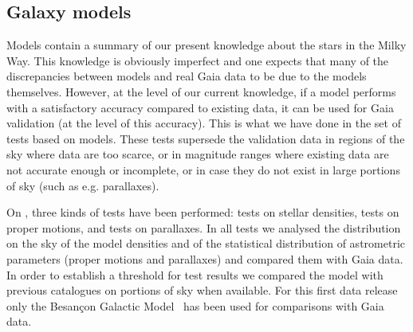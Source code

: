 \subsection{Galaxy models}\label{models-intro}


Models contain a summary of our present knowledge about the stars in the Milky Way. This knowledge is obviously imperfect and one expects that many of the discrepancies between models and real Gaia data to be due to the models themselves. However, at the level of our current knowledge, if a model performs with a satisfactory accuracy compared to existing data, it can be used for Gaia validation (at the level of this accuracy). This is what we have done in the set of tests based on models. These tests  supersede the validation  data in regions of the sky where data are too scarce, or in magnitude ranges where existing data are not accurate enough or incomplete, or in case they do not exist in large portions of sky (such as e.g. parallaxes).

On {}, three kinds of tests have been performed: tests on stellar densities, tests on proper motions, and tests on parallaxes. In all tests we analysed the distribution on the sky of the model densities and of the statistical distribution of astrometric parameters (proper motions and parallaxes) and compared them with Gaia data. In order to establish a threshold for test results we compared the model with previous catalogues on portions of sky when available. For this first data release only the Besan\c{c}on Galactic Model~\citep{bgm} has been used for comparisons with Gaia data. 




